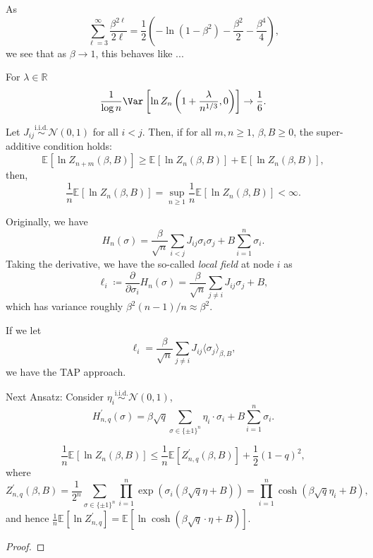 As
\[
	\sum_{\ell =3}^{\infty} \frac{\beta ^{2 \ell }}{2 \ell }
	= \frac{1}{2} \left( - \ln (1 - \beta ^2) - \frac{\beta ^2}{2} - \frac{\beta ^4}{4} \right) ,
\]
we see that as \(\beta \to 1\), this behaves like ...

\begin{conjecture}
	For \(\lambda  \in \mathbb{R} \)
	\[
		\frac{1}{\log n} \Var_{}\left[ \ln Z_{n} \left( 1 + \frac{\lambda }{n^{1 / 3}} , 0 \right) \right]
		\to \frac{1}{6}.
	\]
\end{conjecture}

\begin{theorem}
	Let \(J_{ij} \overset{\text{i.i.d.} }{\sim } \mathcal{N} (0, 1)\) for all \(i < j\). Then, if for all \(m, n \geq 1\), \(\beta , B \geq 0\), the super-additive condition holds:
	\[
		\mathbb{E}_{}[\ln Z_{n+m} (\beta , B)]
		\geq \mathbb{E}_{}[\ln Z_n(\beta , B)] + \mathbb{E}_{}[\ln Z_n(\beta , B)] ,
	\]
	then,
	\[
		\frac{1}{n} \mathbb{E}_{}[\ln Z_n(\beta , B)]
		= \sup _{n \geq 1} \frac{1}{n} \mathbb{E}_{}[\ln Z_n(\beta , B)]
		< \infty .
	\]
\end{theorem}

\begin{note}
	Originally, we have
	\[
		H_n(\sigma )
		= \frac{\beta }{\sqrt{n} } \sum_{i < j} J_{ij} \sigma _i \sigma _j + B \sum_{i=1}^{n} \sigma _i.
	\]
	Taking the derivative, we have the so-called \emph{local field} at node \(i\) as
	\[
		\ell _i
		\coloneqq \frac{\partial }{\partial \sigma _i} H_n(\sigma )
		= \frac{\beta }{\sqrt{n} } \sum_{j \neq i} J_{ij} \sigma _j + B,
	\]
	which has variance roughly \(\beta ^2 (n-1) / n \approx \beta ^2\).
\end{note}

If we let
\[
	\ell _i
	= \frac{\beta }{\sqrt{n} } \sum_{j \neq i} J_{ij} \langle \sigma _j \rangle _{\beta , B},
\]
we have the TAP approach.

Next Ansatz: Consider \(\eta _i \overset{\text{i.i.d.} }{\sim } \mathcal{N} (0, 1)\),
\[
	H_{n, q}^{\prime} (\sigma )
	= \beta \sqrt{q} \sum_{\sigma \in \{ \pm 1 \} ^{n}} \eta _i \cdot \sigma _i + B \sum_{i=1}^{n} \sigma _i.
\]

\begin{theorem}
	\[
		\frac{1}{n} \mathbb{E}_{}[\ln Z_n(\beta , B)]
		\leq \frac{1}{n} \mathbb{E}_{}[Z_{n, q}^{\prime} (\beta , B)] + \frac{1}{2} (1 - q)^2,
	\]
	where
	\[
		Z_{n, q}^{\prime} (\beta , B)
		= \frac{1}{2^n} \sum_{\sigma \in \{ \pm 1 \} ^{n}} \prod_{i=1}^{n} \exp (\sigma _i (\beta \sqrt{q} \eta + B))
		= \prod_{i=1}^{n} \cosh(\beta \sqrt{q} \eta _i + B),
	\]
	and hence \(\frac{1}{n} \mathbb{E}_{}[\ln Z_{n, q}^{\prime} ] = \mathbb{E}_{}[\ln \cosh(\beta \sqrt{q} \cdot \eta + B)] \).
\end{theorem}
\begin{proof}

\end{proof}

